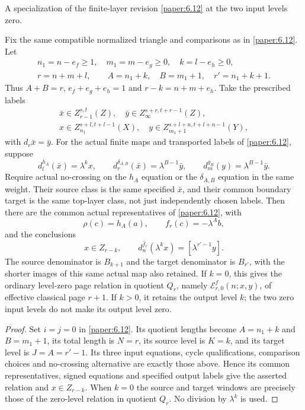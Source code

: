 \begin{corollary}
\label{sem:ProofTools:ss-mahowald-specialization}
A specialization of the finite-layer revision
\ref{paper:6.12} at the two input levels zero.

Fix the same compatible normalized triangle and comparisons as in
\ref{paper:6.12}. Let
\[
\begin{gathered}
n_1=n-e_f\ge1,\quad m_1=m-e_g\ge0,\quad
k=l-e_h\ge0,\\
r=n+m+l,\qquad A=n_1+k,\quad B=m_1+1,\quad
r'=n_1+k+1.
\end{gathered}
\]
Thus $A+B=r$, $e_f+e_g+e_h=1$ and $r-k=n+m+e_h$.
Take the prescribed labels
\[
\begin{gathered}
\bar x\in Z_{r-1}^{s,t}(Z),\quad
\bar y\in Z_\infty^{s+r,t+r-1}(Z),\\
x\in Z_{n_1}^{s+l,t+l-1}(X),\quad
y\in Z_{m_1+1}^{s+l+n,t+l+n-1}(Y),
\end{gathered}
\]
with $d_r\bar x=\bar y$. For the actual finite maps and transported
labels of \ref{paper:6.12}, suppose
\[
d_l^{h_A}(\bar x)=\lambda^kx,\qquad
d_r^{\delta_{A,B}}(\bar x)=\lambda^{B-1}\bar y,\qquad
d_m^{g_B}(y)=\lambda^{B-1}\bar y.
\]
Require actual no-crossing on the $h_A$ equation or the
$\delta_{A,B}$ equation in the same weight. Their source class is
the same specified $\bar x$, and their common boundary target is
the same top-layer class, not just independently chosen labels.
Then there are the common actual representatives of
\ref{paper:6.12}, with
\[
\rho(c)=h_A(a),\qquad f_r(c)=-\lambda^Ab,
\]
and the conclusions
\[
x\in Z_{r-k},\qquad
d_n^{\widehat f_r}(\lambda^kx)=[\lambda^{r'-1}y].
\]
The source denominator is $B_{k+1}$ and the target denominator is
$B_{r'}$, with the shorter images of this same actual map also
retained. If $k=0$, this gives the ordinary level-zero page relation
in quotient $Q_r$, namely $\mathcal E^f_{r,0}(n;x,y)$, of effective
classical page $r+1$. If $k>0$, it retains the output level $k$;
the two zero input levels do not make its output level zero.
\end{corollary}
\begin{proof}
Set $i=j=0$ in \ref{paper:6.12}. Its quotient lengths become
$A=n_1+k$ and $B=m_1+1$, its total length is $N=r$, its source
level is $K=k$, and its target level is $J=A=r'-1$. Its three
input equations, cycle qualifications, comparison choices and
no-crossing alternative are exactly those above. Hence its common
representatives, signed equations and specified output labels give
the asserted relation and $x\in Z_{r-k}$. When $k=0$ the source
and target windows are precisely those of the zero-level relation
in quotient $Q_r$. No division by $\lambda^k$ is used.
\end{proof}

